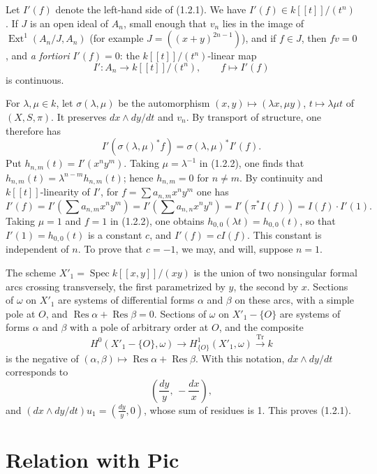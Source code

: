 \documentclass[11pt]{article}
\DeclareMathOperator{\Spec}{Spec}
\DeclareMathOperator{\Ext}{Ext}
\DeclareMathOperator{\Res}{Res}
\DeclareMathOperator{\Tr}{Tr}
\begin{document}
Let $I'(f)$ denote the left-hand side of (1.2.1). We have $I'(f)\in k[[t]]/(t^n)$. If $J$ is an open ideal of $A_n$, small enough that $v_n$ lies in the image of $\Ext^1(A_n/J,A_n)$ (for example $J=((x+y)^{2n-1})$), and if $f\in J$, then $fv=0$, and \emph{a fortiori} $I'(f)=0$: the $k[[t]]/(t^n)$-linear map
\[
        I':A_n\longrightarrow k[[t]]/(t^n),\qquad f\longmapsto I'(f)
\]
is continuous.

For $\lambda,\mu\in k$, let $\sigma(\lambda,\mu)$ be the automorphism $(x,y)\mapsto(\lambda x,\mu y)$, $t\mapsto\lambda\mu t$ of $(X,S,\pi)$. It preserves $dx\wedge dy/dt$ and $v_n$. By transport of structure, one therefore has
\begin{equation}
        I'(\sigma(\lambda,\mu)^*f)=\sigma(\lambda,\mu)^*I'(f). \tag{1.2.2}
\end{equation}
Put $h_{n,m}(t)=I'(x^ny^m)$. Taking $\mu=\lambda^{-1}$ in (1.2.2), one finds that $h_{n,m}(t)=\lambda^{n-m}h_{n,m}(t)$; hence $h_{n,m}=0$ for $n\ne m$. By continuity and $k[[t]]$-linearity of $I'$, for $f=\sum a_{n,m}x^ny^m$ one has
\[
        I'(f)=I'\left(\sum a_{n,m}x^ny^m\right)
             =I'\left(\sum a_{n,n}x^ny^n\right)
             =I'(\pi^*I(f))=I(f)\cdot I'(1).
\]
Taking $\mu=1$ and $f=1$ in (1.2.2), one obtains $h_{0,0}(\lambda t)=h_{0,0}(t)$, so that $I'(1)=h_{0,0}(t)$ is a constant $c$, and $I'(f)=cI(f)$. This constant is independent of $n$. To prove that $c=-1$, we may, and will, suppose $n=1$.

The scheme $X'_1=\Spec k[[x,y]]/(xy)$ is the union of two nonsingular formal arcs crossing transversely, the first parametrized by $y$, the second by $x$. Sections of $\omega$ on $X'_1$ are systems of differential forms $\alpha$ and $\beta$ on these arcs, with a simple pole at $O$, and $\Res\alpha+\Res\beta=0$. Sections of $\omega$ on $X'_1-\{O\}$ are systems of forms $\alpha$ and $\beta$ with a pole of arbitrary order at $O$, and the composite
\[
        H^0(X'_1-\{O\},\omega)\longrightarrow H^1_{\{O\}}(X'_1,\omega)\xrightarrow{\Tr} k
\]
is the negative of $(\alpha,\beta)\mapsto\Res\alpha+\Res\beta$. With this notation, $dx\wedge dy/dt$ corresponds to
\[
        \left(\frac{dy}{y},\,-\frac{dx}{x}\right),
\]
and $(dx\wedge dy/dt)u_1=\left(\frac{dy}{y},0\right)$, whose sum of residues is 1. This proves (1.2.1).

\section{Relation with Pic}
\end{document}
